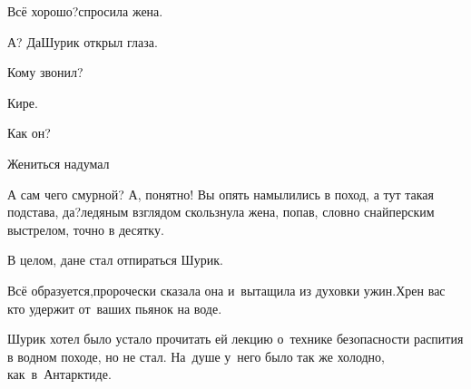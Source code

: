 {	\diagdash Всё хорошо?\mdash спросила жена.
	
	\diagdash А? Да\myldots{}\mdash Шурик открыл глаза.
	
	\diagdash Кому звонил?
	
	\diagdash Кире.
	
	\diagdash Как он? 
	
	\diagdash Жениться надумал\myldots{} 
	
	\diagdash А сам чего смурной? А, понятно! Вы опять намылились в поход, а тут такая подстава, да?\mdash ледяным взглядом скользнула жена, попав, словно снайперским выстрелом, точно в десятку.%
	
	\diagdash В целом, да\myldots{}\mdash не стал отпираться Шурик.
	
	\diagdash Всё образуется,\mdash пророчески сказала она и~вытащила из духовки ужин.\mdash Хрен вас кто удержит от~ваших пьянок на воде.
	
	Шурик хотел было устало прочитать ей лекцию о~технике безопасности распития в водном походе, но не стал.  На~душе у~него было так же холодно, как~в~Антарктиде.%
	
	\vspace{-0.2cm}
%	
	\begin{center}
	\end{center}
}